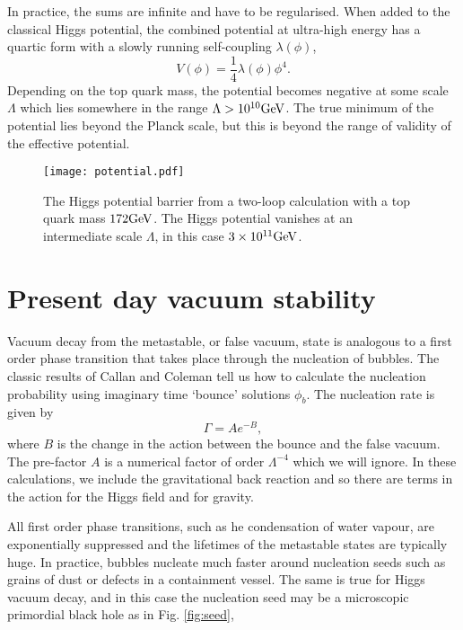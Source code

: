 \documentclass{PoS}
\begin{document}
In practice, the sums are infinite and have to be regularised. When added to
the classical Higgs potential, the combined potential at ultra-high energy has a quartic form
with a slowly running self-coupling $\lambda(\phi)$,
\begin{equation}
V(\phi)=\frac14\lambda(\phi)\phi^4.
\end{equation}
Depending on the top quark mass, the potential becomes negative at some scale
$\Lambda$ which lies somewhere in the range $\Lambda>10^{10}{\rm GeV}$.
The true minimum of the potential lies beyond the Planck scale, but this
is beyond the range of validity of the effective potential.

\begin{figure}
\centering
\texttt{[image: potential.pdf]}
\caption{The Higgs potential barrier from a two-loop calculation
with a top quark mass $172{\rm GeV}$. The Higgs potential vanishes 
at an intermediate scale $\Lambda$, in this
case $3\times 10^{11}{\rm GeV}$.} \label{fig:potential}
\end{figure}

\section{Present day vacuum stability}

Vacuum decay from the metastable, or false vacuum, state  is analogous 
to a first order phase transition that takes place through the nucleation of bubbles. 
The classic results of Callan and Coleman \cite{coleman1977,callan1977} 
tell us how to calculate the nucleation probability using 
imaginary time `bounce' solutions $\phi_b$.
The nucleation rate is given by
\begin{equation}
\Gamma=Ae^{-B},
\end{equation}
where $B$ is the change in the action between the bounce and the false vacuum. 
The pre-factor $A$ is a numerical factor of order $\Lambda^{-4}$
which we will ignore.
In these calculations, we include the gravitational back reaction and so there are terms
in the action for the Higgs field and for gravity.

All first order phase transitions, such as he condensation of water vapour,
are exponentially suppressed and the lifetimes of the metastable states are
typically huge. In practice, bubbles nucleate much faster around nucleation 
seeds such as grains of dust or defects in a containment vessel. The same is true
for Higgs vacuum decay, and in this case the nucleation seed may be a microscopic
primordial black hole as in Fig. \ref{fig:seed},
\end{document}
